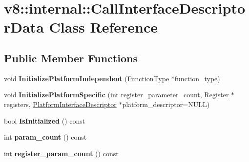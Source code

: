 \hypertarget{classv8_1_1internal_1_1_call_interface_descriptor_data}{}\section{v8\+:\+:internal\+:\+:Call\+Interface\+Descriptor\+Data Class Reference}
\label{classv8_1_1internal_1_1_call_interface_descriptor_data}
\subsection*{Public Member Functions}
\begin{DoxyCompactItemize}
\item 
void {\bfseries Initialize\+Platform\+Independent} (\hyperlink{classv8_1_1internal_1_1_function_type}{Function\+Type} $\ast$function\+\_\+type)\hypertarget{classv8_1_1internal_1_1_call_interface_descriptor_data_a1b544fefef1c1218e74529d2151314fe}{}\label{classv8_1_1internal_1_1_call_interface_descriptor_data_a1b544fefef1c1218e74529d2151314fe}

\item 
void {\bfseries Initialize\+Platform\+Specific} (int register\+\_\+parameter\+\_\+count, \hyperlink{structv8_1_1internal_1_1_register}{Register} $\ast$registers, \hyperlink{classv8_1_1internal_1_1_platform_interface_descriptor}{Platform\+Interface\+Descriptor} $\ast$platform\+\_\+descriptor=N\+U\+LL)\hypertarget{classv8_1_1internal_1_1_call_interface_descriptor_data_a87c32baf83041b6c5e7fd299b12b1c74}{}\label{classv8_1_1internal_1_1_call_interface_descriptor_data_a87c32baf83041b6c5e7fd299b12b1c74}

\item 
bool {\bfseries Is\+Initialized} () const \hypertarget{classv8_1_1internal_1_1_call_interface_descriptor_data_ab5f3e81e6bdccf0281adaad893879572}{}\label{classv8_1_1internal_1_1_call_interface_descriptor_data_ab5f3e81e6bdccf0281adaad893879572}

\item 
int {\bfseries param\+\_\+count} () const \hypertarget{classv8_1_1internal_1_1_call_interface_descriptor_data_aca94bfb93d2f99206273f8607ea09fa4}{}\label{classv8_1_1internal_1_1_call_interface_descriptor_data_aca94bfb93d2f99206273f8607ea09fa4}

\item 
int {\bfseries register\+\_\+param\+\_\+count} () const \hypertarget{classv8_1_1internal_1_1_call_interface_descriptor_data_a4e46a42fa7b453f578ce4e6d61b9ec89}{}\label{classv8_1_1internal_1_1_call_interface_descriptor_data_a4e46a42fa7b453f578ce4e6d61b9ec89}


\end{DoxyCompactItemize}
